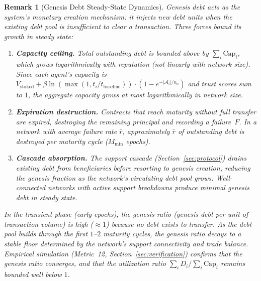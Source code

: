 \documentclass[11pt]{article}
\newtheorem{remark}[theorem]{Remark}
\begin{document}
\begin{remark}[Genesis Debt Steady-State Dynamics]\label{rem:genesis_steady_state}
Genesis debt acts as the system's monetary creation mechanism: it injects new debt units when the existing debt pool is insufficient to clear a transaction. Three forces bound its growth in steady state:
\begin{enumerate}
    \item \textbf{Capacity ceiling.} Total outstanding debt is bounded above by $\sum_i \text{Cap}_i$, which grows logarithmically with reputation (not linearly with network size). Since each agent's capacity is $V_{\text{staked}} + \beta \ln(\max(1, t_i / t_{\text{baseline}})) \cdot (1 - e^{-|\mathcal{A}_i|/n_0})$ and trust scores sum to $1$, the aggregate capacity grows at most logarithmically in network size.
    \item \textbf{Expiration destruction.} Contracts that reach maturity without full transfer are expired, destroying the remaining principal and recording a failure~$F$. In a network with average failure rate $\bar{r}$, approximately $\bar{r}$ of outstanding debt is destroyed per maturity cycle ($M_{\min}$ epochs).
    \item \textbf{Cascade absorption.} The support cascade (Section~\ref{sec:protocol}) drains existing debt from beneficiaries before resorting to genesis creation, reducing the genesis fraction as the network's circulating debt pool grows. Well-connected networks with active support breakdowns produce minimal genesis debt in steady state.
\end{enumerate}
In the transient phase (early epochs), the genesis ratio (genesis debt per unit of transaction volume) is high ($\approx 1$) because no debt exists to transfer. As the debt pool builds through the first $1$--$2$ maturity cycles, the genesis ratio decays to a stable floor determined by the network's support connectivity and trade balance. Empirical simulation (Metric~12, Section~\ref{sec:verification}) confirms that the genesis ratio converges, and that the utilization ratio $\sum_i D_i / \sum_i \text{Cap}_i$ remains bounded well below $1$.
\end{remark}
\end{document}
